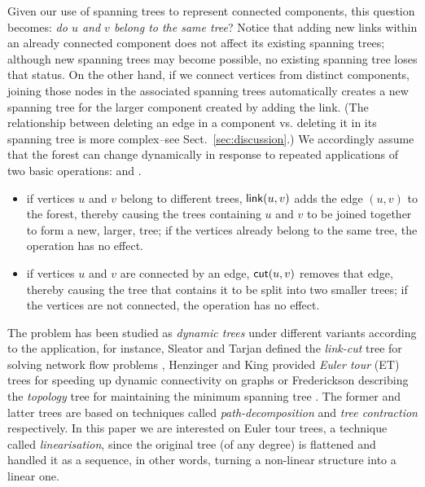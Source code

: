 Given our use of spanning trees to represent connected components, this question becomes: \emph{do $u$ and $v$ belong to the same tree}? Notice that adding new links within an already connected component does not affect its existing spanning trees; although new spanning trees may become possible, no existing spanning tree loses that status. On the other hand, if we connect vertices from distinct components, joining those nodes in the associated spanning trees automatically creates a new spanning tree for the larger component created by adding the link. (The relationship between deleting an edge in a component vs. deleting it in its spanning tree is more complex--see Sect.~\ref{sec:discussion}.)  We accordingly assume that the forest can change dynamically in response to repeated applications of two basic operations: \link and \cut. 
\begin{itemize}
\item
  if vertices $u$ and $v$ belong to different trees, $\mathsf{link}(u,v)$ adds the edge $(u,v)$ to the forest, thereby causing the trees containing $u$ and $v$ to be joined together to form a new, larger, tree; if the vertices already belong to the same tree, the operation has no effect.
\item
  if vertices $u$ and $v$ are connected by an edge, $\mathsf{cut}(u,v)$ removes that edge, thereby causing the tree that contains it to be split into two smaller trees; if the vertices are not connected, the operation has no effect. 
\end{itemize}


The problem has been studied as \textit{dynamic trees} under different variants according to the application, for instance, Sleator and Tarjan defined the \textit{link-cut} tree for solving network flow problems \cite{DS-DynTs}, Henzinger and King provided \textit{Euler tour} (ET) trees for speeding up dynamic connectivity on graphs \cite{Rand-DynGs-Algos} or Frederickson describing the \textit{topology} tree for maintaining the minimum spanning tree \cite{DSs-Online-Upd-MSTs}. The former and latter trees are based on techniques called \textit{path-decomposition} and \textit{tree contraction} respectively. In this paper we are interested on Euler tour trees, a technique called \textit{linearisation}, since the original tree (of any degree) is flattened and handled it as a sequence, in other words, turning a non-linear structure into a linear one.

